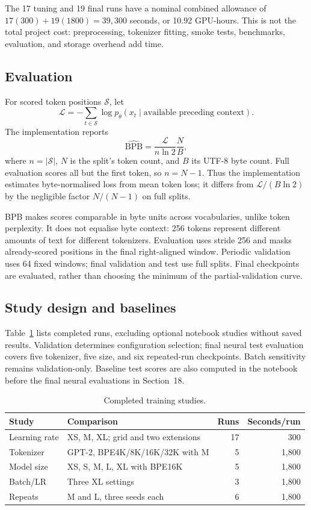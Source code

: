 \documentclass[11pt]{article}
\begin{document}
The 17 tuning and 19 final runs have a nominal combined allowance of $17(300)+19(1800)=39{,}300$ seconds, or 10.92 GPU-hours. This is not the total project cost: preprocessing, tokenizer fitting, smoke tests, benchmarks, evaluation, and storage overhead add time.

\subsection{Evaluation}
For scored token positions $\mathcal{S}$, let
\[
\mathcal{L}=-\sum_{t\in\mathcal{S}}\log p_\theta(x_t\mid\text{available preceding context}).
\]
The implementation reports
\[
\widehat{\mathrm{BPB}}=\frac{\mathcal{L}}{n\ln 2}\frac{N}{B},
\]
where $n=|\mathcal{S}|$, $N$ is the split's token count, and $B$ its UTF-8 byte count. Full evaluation scores all but the first token, so $n=N-1$. Thus the implementation estimates byte-normalised loss from mean token loss; it differs from $\mathcal{L}/(B\ln2)$ by the negligible factor $N/(N-1)$ on full splits.

BPB makes scores comparable in byte units across vocabularies, unlike token perplexity. It does not equalise byte context: 256 tokens represent different amounts of text for different tokenizers. Evaluation uses stride 256 and masks already-scored positions in the final right-aligned window. Periodic validation uses 64 fixed windows; final validation and test use full splits. Final checkpoints are evaluated, rather than choosing the minimum of the partial-validation curve.

\subsection{Study design and baselines}
Table~\ref{tab:studies} lists completed runs, excluding optional notebook studies without saved results. Validation determines configuration selection; final neural test evaluation covers five tokenizer, five size, and six repeated-run checkpoints. Batch sensitivity remains validation-only. Baseline test scores are also computed in the notebook before the final neural evaluations in Section~18.

\begin{table}[htbp]
\centering\small
\caption{Completed training studies.}
\label{tab:studies}
\begin{tabularx}{\linewidth}{@{}lXrr@{}}
\toprule
Study & Comparison & Runs & Seconds/run\\
\midrule
Learning rate & XS, M, XL; grid and two extensions & 17 & 300\\
Tokenizer & GPT-2, BPE4K/8K/16K/32K with M & 5 & 1,800\\
Model size & XS, S, M, L, XL with BPE16K & 5 & 1,800\\
Batch/LR & Three XL settings & 3 & 1,800\\
Repeats & M and L, three    seeds each & 6 & 1,800\\
\bottomrule
\end{tabularx}
\end{table}
\end{document}
